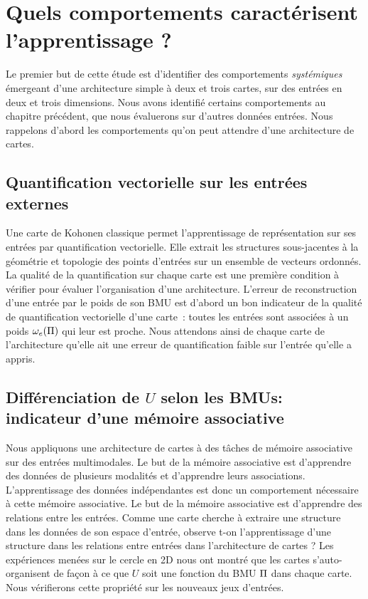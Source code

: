 \documentclass[../main]{subfiles}
\begin{document}
\section{Quels comportements caractérisent l'apprentissage ?}

Le premier but de cette étude est d'identifier des comportements \emph{systémiques} émergeant d'une architecture simple à deux et trois cartes, sur des entrées en deux et trois dimensions.
Nous avons identifié certains comportements au chapitre précédent, que nous évaluerons sur d'autres données entrées. Nous rappelons d'abord les comportements qu'on peut attendre d'une architecture de cartes.

\subsection{Quantification vectorielle sur les entrées externes}

Une carte de Kohonen classique permet l'apprentissage de représentation sur ses entrées par quantification vectorielle. Elle extrait les structures sous-jacentes à la géométrie et topologie des points d'entrées sur un ensemble de vecteurs ordonnés.
La qualité de la quantification sur chaque carte est une première condition à vérifier pour évaluer l'organisation d'une architecture.
L'erreur de reconstruction d'une entrée par le poids de son BMU est d'abord un bon indicateur de la qualité de quantification vectorielle d'une carte~: toutes les entrées sont associées à un poids $\omega_{e}(\Pi)$ qui leur est proche.
Nous attendons ainsi de chaque carte de l'architecture qu'elle ait une erreur de quantification faible sur l'entrée qu'elle a appris.

\subsection{Différenciation de $U$ selon les BMUs: indicateur d'une mémoire associative}

Nous appliquons une architecture de cartes à des tâches de mémoire associative sur des entrées multimodales.
Le but de la mémoire associative est d'apprendre des données de plusieurs modalités et d'apprendre leurs associations. L'apprentissage des données indépendantes est donc un comportement nécessaire à cette mémoire associative. 
Le but de la mémoire associative est d'apprendre des relations entre les entrées. Comme une carte cherche à extraire une structure dans les données de son espace d'entrée, observe t-on l'apprentissage d'une structure dans les relations entre entrées dans l'architecture de cartes ?
Les expériences menées sur le cercle en 2D nous ont montré que les cartes s'auto-organisent de façon à ce que $U$ soit une fonction du BMU $\Pi$ dans chaque carte. Nous vérifierons cette propriété sur les nouveaux jeux d'entrées.
\end{document}
